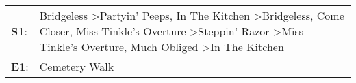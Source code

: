 \begin{supertabular}{p{0.03\textwidth}p{0.92\textwidth}}
 \textbf{S1}:  &  Bridgeless\textsuperscript{} \textgreater \enspace Partyin' Peeps\textsuperscript{}, \enspace In The Kitchen\textsuperscript{} \textgreater \enspace Bridgeless\textsuperscript{}, \enspace Come Closer\textsuperscript{}, \enspace Miss Tinkle's Overture\textsuperscript{} \textgreater \enspace Steppin' Razor\textsuperscript{} \textgreater \enspace Miss Tinkle's Overture\textsuperscript{}, \enspace Much Obliged\textsuperscript{} \textgreater \enspace In The Kitchen\textsuperscript{}  \enspace  \\
 \textbf{E1}:  &                                                                                                                                                                                                                                                                                                                                                                                                                                                                     Cemetery Walk\textsuperscript{}  \enspace  \\
\end{supertabular}
